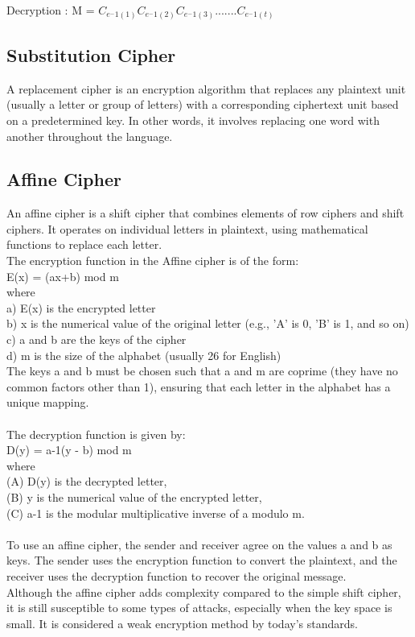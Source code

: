 \documentclass[11pt]{article}
\begin{document}
Decryption : M = $C_{e^-1(1)} C_{e^-1(2)} C_{e^-1(3)}.......C_{e^-1(t)}$

\subsection{Substitution Cipher}
A replacement cipher is an encryption algorithm that replaces any plaintext unit (usually a letter or group of letters) with a corresponding ciphertext unit based on a predetermined key. In other words, it involves replacing one word with another throughout the language.

\subsection{Affine Cipher}
An affine cipher is a shift cipher that combines elements of row ciphers and shift ciphers. It operates on individual letters in plaintext, using mathematical functions to replace each letter.\\
The encryption function in the Affine cipher is of the form:\\
E(x) = (ax+b) mod m\\
where \\
a) E(x) is the encrypted letter\\
b) x is the numerical value of the original letter (e.g., 'A' is 0, 'B' is 1, and so on)\\
c) a and b are the keys of the cipher\\
d) m is the size of the alphabet (usually 26 for English)\\
The keys a and b must be chosen such that a and m are coprime (they have no common factors other than 1), ensuring that each letter in the alphabet has a unique mapping.\\\\
The decryption function is given by:\\
 D(y) =  a-1(y - b) mod m\\
where\\
(A) D(y) is the decrypted letter,\\
(B) y is the numerical value of the encrypted letter,\\
(C) a-1 is the modular multiplicative inverse of a modulo m.
\\\\
To use an affine cipher, the sender and receiver agree on the values a and b as keys. The sender uses the encryption function to convert the plaintext, and the receiver uses the decryption function to recover the original message.\\
Although the affine cipher adds complexity compared to the simple shift cipher, it is still susceptible to some types of attacks, especially when the key space is small. It is considered a weak encryption method by today's standards.
\end{document}
